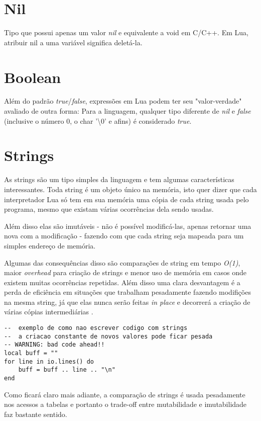 \documentclass[a4paper,12pt]{abnt}
\begin{document}
\section{Nil}

Tipo que possui apenas um valor \emph{nil} e equivalente a void em C/C++.
Em Lua, atribuir nil a uma variável significa deletá-la.

\section{Boolean}

Além do padrão \emph{true}/\emph{false}, expressões em Lua podem ter seu
"valor-verdade" avaliado de outra forma: Para a linguagem,
qualquer tipo diferente de \emph{nil} e \emph{false}
(inclusive o número 0, o char '\textbackslash0' e afins)
é considerado \emph{true}.

\section{Strings}

As strings são um tipo simples da linguagem e tem algumas
características interessantes.
Toda string é um objeto único na memória, isto quer dizer que cada
interpretador Lua só tem em sua memória uma cópia de
cada string usada pelo programa, mesmo que existam várias
ocorrências dela sendo usadas.

Além disso elas são imutáveis - não é possível modificá-las,
apenas retornar uma nova com a
modificação - fazendo com que cada string seja
mapeada para um simples endereço de memória.

Algumas das consequências disso são comparações de
string em tempo \emph{O(1)}, maior \emph{overhead} para criação de strings
e menor uso de memória em casos onde existem muitas ocorrências repetidas.
Além disso uma clara desvantagem é a perda de eficiência em situações
que trabalham pesadamente fazendo modifições na mesma string,
já que elas nunca serão feitas \emph{in place} e decorrerá a criação de várias
cópias intermediárias \cite{pil}.

\begin{lstlisting}
--	exemplo de como nao escrever codigo com strings
--	a criacao constante de novos valores pode ficar pesada
-- WARNING: bad code ahead!!
local buff = ""
for line in io.lines() do
    buff = buff .. line .. "\n"
end
\end{lstlisting}

Como ficará claro mais adiante, a comparação de strings é usada
pesadamente nos acessos a tabelas e portanto o trade-off
entre mutabilidade e imutabilidade faz bastante sentido.
\end{document}
